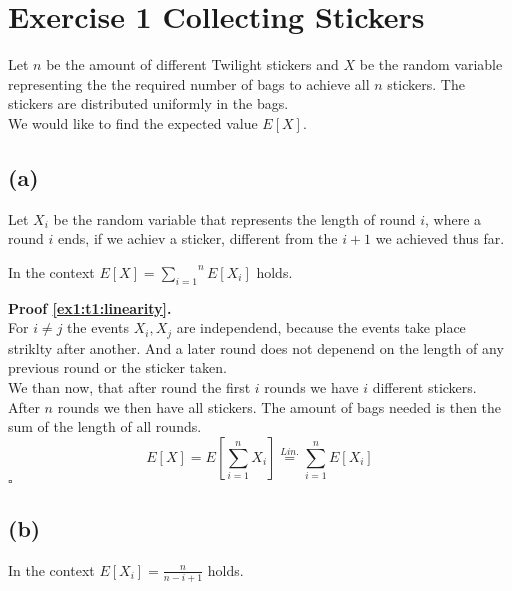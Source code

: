 \section*{Exercise 1 \mdseries Collecting Stickers}

Let $n$ be the amount of different Twilight stickers and $X$ be the random variable representing the the required number of bags to achieve all $n$ stickers.
The stickers are distributed uniformly in the bags.\\
We would like to find the expected value $E[X]$.


\subsection*{(a)}

Let $X_i$ be the random variable that represents the length of round $i$, where a round $i$ ends, if we achiev a sticker, different from the $i+1$ we
achieved thus far.

\begin{lemma}\label{ex1:t1:linearity}
    In the context $E[X] = \overset{n}{\underset{i=1}{\sum}} E[X_i]$ holds.
\end{lemma}

\textbf{Proof \ref{ex1:t1:linearity}.}\\
For $i \not= j$ the events $X_i, X_j$ are independend, because the events take place striklty after another. And a later round does not
depenend on the length of any previous round or the sticker taken.\\
We than now, that after round the first $i$ rounds we have $i$ different stickers. After $n$ rounds we then have all stickers.
The amount of bags needed is then the sum of the length of all rounds.\\
$$
    E[X] = E \left[ \sum_{i=1}^{n} X_i \right] \stackrel{Lin.}{=} \sum_{i=1}^{n} E [X_i]
$$
\mbox{} \hfill $\square$



\subsection*{(b)}

\begin{lemma}\label{ex1:t1:rounds}
    In the context $E[X_i] = \frac{n}{n-i+1}$ holds.
\end{lemma}


